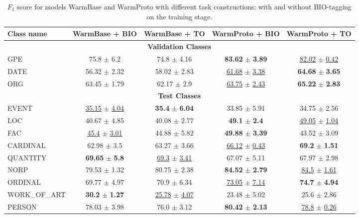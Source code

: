 \begin{table*}[t!]
\begin{center}
\begin{tabular}{|l|cccc|}
\hline \bf Class name & \bf WarmBase + BIO & \bf WarmBase + TO & \bf WarmProto + BIO & \bf WarmProto + TO\\
\hline
 \multicolumn{5}{|c|}{\textbf{Validation Classes}} \\
\hline
GPE & 75.8 $\pm$ 6.2 & 74.8 $\pm$ 4.16 & \textbf{83.62} $\pm$ \textbf{3.89} & \underline{82.02} $\pm$ \underline{0.42} \\
DATE & 56.32 $\pm$ 2.32 & 58.02 $\pm$ 2.83 & \underline{61.68} $\pm$ \underline{3.38} & \textbf{64.68} $\pm$ \textbf{3.65} \\
ORG & 63.45 $\pm$ 1.79 & 62.17 $\pm$ 2.9 & \underline{63.75} $\pm$ \underline{2.43} & \textbf{65.22} $\pm$ \textbf{2.83} \\
\hline
 \multicolumn{5}{|c|}{\textbf{Test Classes}} \\
\hline
EVENT & \underline{35.15} $\pm$ \underline{4.04} & \textbf{35.4} $\pm$ \textbf{6.04} & 33.85 $\pm$ 5.91 & 34.75 $\pm$ 2.56 \\
LOC & 40.67 $\pm$ 4.85 & 40.08 $\pm$ 2.77 & \textbf{49.1} $\pm$ \textbf{2.4} & \underline{49.05} $\pm$ \underline{1.04} \\
FAC & \underline{45.4} $\pm$ \underline{3.01} & 44.88 $\pm$ 5.82 & \textbf{49.88} $\pm$ \textbf{3.39} & 43.52 $\pm$ 3.09 \\
CARDINAL & 62.98 $\pm$ 3.5 & 63.27 $\pm$ 3.66 & \underline{66.12} $\pm$ \underline{0.43} & \textbf{69.2} $\pm$ \textbf{1.51} \\
QUANTITY & \textbf{69.65} $\pm$ \textbf{5.8} & \underline{69.3} $\pm$ \underline{3.41} & 67.07 $\pm$ 5.11 & 67.97 $\pm$ 2.98 \\
NORP & 79.53 $\pm$ 1.32 & 80.75 $\pm$ 2.38 & \textbf{84.52} $\pm$ \textbf{2.79} & \underline{84.5} $\pm$ \underline{1.61} \\
ORDINAL & 69.77 $\pm$ 4.97 & 70.9 $\pm$ 6.34 & \underline{73.05} $\pm$ \underline{7.14} & \textbf{74.7} $\pm$ \textbf{4.94} \\
WORK\_OF\_ART & \textbf{30.2} $\pm$ \textbf{1.27} & \underline{25.78} $\pm$ \underline{4.07} & 23.48 $\pm$ 5.02 & 25.6 $\pm$ 2.86 \\
PERSON & 78.03 $\pm$ 3.98 & 76.0 $\pm$ 3.12 & \textbf{80.42} $\pm$ \textbf{2.13} & \underline{78.8} $\pm$ \underline{0.26} \\
\hline
\end{tabular}
\end{center}
\caption{\label{baseline_sl} $F_1$ score for models WarmBase and WarmProto with different task constructions: with and without BIO-tagging on the training stage.}
\end{table*}
